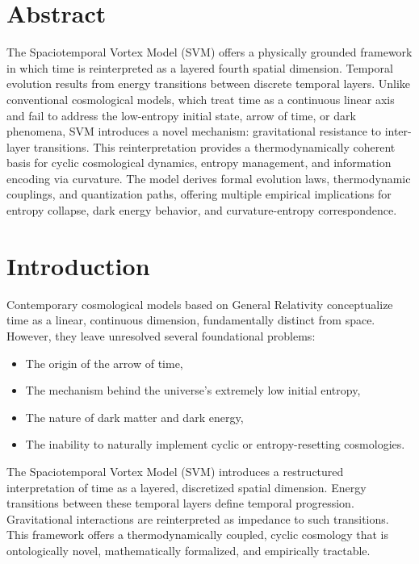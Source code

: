 
\section*{Abstract}

The Spaciotemporal Vortex Model (SVM) offers a physically grounded framework in which time is reinterpreted as a layered fourth spatial dimension. Temporal evolution results from energy transitions between discrete temporal layers. Unlike conventional cosmological models, which treat time as a continuous linear axis and fail to address the low-entropy initial state, arrow of time, or dark phenomena, SVM introduces a novel mechanism: gravitational resistance to inter-layer transitions. This reinterpretation provides a thermodynamically coherent basis for cyclic cosmological dynamics, entropy management, and information encoding via curvature. The model derives formal evolution laws, thermodynamic couplings, and quantization paths, offering multiple empirical implications for entropy collapse, dark energy behavior, and curvature-entropy correspondence.


\section{Introduction}

Contemporary cosmological models based on General Relativity conceptualize time as a linear, continuous dimension, fundamentally distinct from space. However, they leave unresolved several foundational problems:

\begin{itemize}
    \item The origin of the arrow of time,
    \item The mechanism behind the universe's extremely low initial entropy,
    \item The nature of dark matter and dark energy,
    \item The inability to naturally implement cyclic or entropy-resetting cosmologies.
\end{itemize}

The Spaciotemporal Vortex Model (SVM) introduces a restructured interpretation of time as a layered, discretized spatial dimension. Energy transitions between these temporal layers define temporal progression. Gravitational interactions are reinterpreted as impedance to such transitions. This framework offers a thermodynamically coupled, cyclic cosmology that is ontologically novel, mathematically formalized, and empirically tractable.
